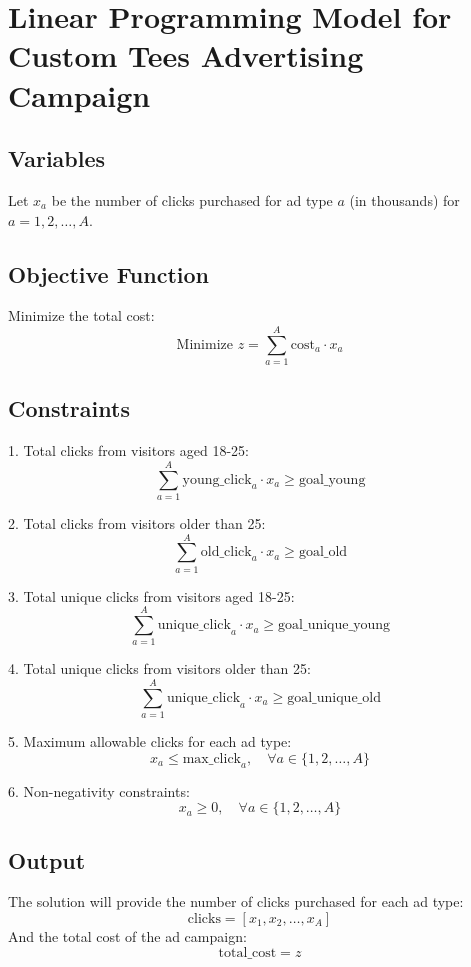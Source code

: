 \documentclass{article}
\begin{document}
\section*{Linear Programming Model for Custom Tees Advertising Campaign}

\subsection*{Variables}
Let \( x_a \) be the number of clicks purchased for ad type \( a \) (in thousands) for \( a = 1, 2, \ldots, A \).

\subsection*{Objective Function}
Minimize the total cost:
\[
\text{Minimize } z = \sum_{a=1}^{A} \text{cost}_a \cdot x_a
\]

\subsection*{Constraints}

1. Total clicks from visitors aged 18-25:
\[
\sum_{a=1}^{A} \text{young\_click}_{a} \cdot x_a \geq \text{goal\_young}
\]

2. Total clicks from visitors older than 25:
\[
\sum_{a=1}^{A} \text{old\_click}_{a} \cdot x_a \geq \text{goal\_old}
\]

3. Total unique clicks from visitors aged 18-25:
\[
\sum_{a=1}^{A} \text{unique\_click}_{a} \cdot x_a \geq \text{goal\_unique\_young}
\]

4. Total unique clicks from visitors older than 25:
\[
\sum_{a=1}^{A} \text{unique\_click}_{a} \cdot x_a \geq \text{goal\_unique\_old}
\]

5. Maximum allowable clicks for each ad type:
\[
x_a \leq \text{max\_click}_{a}, \quad \forall a \in \{1, 2, \ldots, A\}
\]

6. Non-negativity constraints:
\[
x_a \geq 0, \quad \forall a \in \{1, 2, \ldots, A\}
\]

\subsection*{Output}
The solution will provide the number of clicks purchased for each ad type:
\[
\text{clicks} = [x_1, x_2, \ldots, x_A]
\]
And the total cost of the ad campaign:
\[
\text{total\_cost} = z
\]
\end{document}
